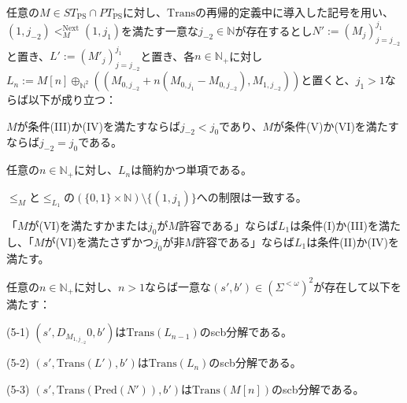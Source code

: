 \documentclass[dvipdfmx,uplatex]{jsarticle}
\theoremstyle{customnonumberbreakfortheorem}
\theoremstyle{customnonumberbreakforproof}
\begin{document}
\begin{lemma}\label{条件(III)～(VI)の下での展開規則の基本性質}
	任意の\(M \in ST_{\textrm{PS}} \cap PT_{\textrm{PS}}\)に対し、\(\textrm{Trans}\)の再帰的定義中に導入した記号を用い、\((1,j_{-2}) <_M^{\textrm{Next}} (1,j_1)\)を満たす一意な\(j_{-2} \in \mathbb{N}\)が存在するとし\(N' := (M_j)_{j=j_{-2}}^{j_1}\)と置き、\(L' := (M'_j)_{j=j_{-2}}^{j_1}\)と置き、各\(n \in \mathbb{N}_{+}\)に対し\(L_n := M[n] \oplus_{\mathbb{N}^2} ((M_{0,j_{-2}}+n(M_{0,j_1}-M_{0,j_{-2}}),M_{1,j_{-2}}))\)と置くと\footnotemark{}、\(j_1 > 1\)\footnotemark{}ならば以下が成り立つ：
	\begin{penumerate}
		\item \(M\)が条件(III)か(IV)を満たすならば\(j_{-2} < j_0\)であり、\(M\)が条件(V)か(VI)を満たすならば\(j_{-2} = j_0\)である。
		\item 任意の\(n \in \mathbb{N}_{+}\)に対し、\(L_n\)は簡約かつ単項である。
		\item \(\leq_M\)と\(\leq_{L_1}\)の\((\{0,1\} \times \mathbb{N}) \setminus \{(1,j_1)\}\)への制限は一致する。
		\item 「\(M\)が(VI)を満たすかまたは\(j_0\)が\(M\)許容である」ならば\(L_1\)は条件(I)か(III)を満たし、「\(M\)が(VI)を満たさずかつ\(j_0\)が非\(M\)許容である」ならば\(L_1\)は条件(II)か(IV)を満たす\footnotemark{}。
		\item 任意の\(n \in \mathbb{N}_{+}\)に対し、\(n > 1\)ならば一意な\((s',b') \in (\Sigma^{< \omega})^2\)が存在して以下を満たす：
		\begin{indented}
			\item[(5-1)] \((s',D_{M_{1,j_{-2}}} 0,b')\)は\(\textrm{Trans}(L_{n-1})\)のscb分解である。
			\item[(5-2)] \((s',\textrm{Trans}(L'),b')\)は\(\textrm{Trans}(L_n)\)のscb分解である。
			\item[(5-3)] \((s',\textrm{Trans}(\textrm{Pred}(N')),b')\)は\(\textrm{Trans}(M[n])\)のscb分解である。
		\end{indented}
	\end{penumerate}
\end{lemma}
\addtocounter{footnote}{-2}
\addtocounter{footnote}{1}
\addtocounter{footnote}{1}
\end{document}
